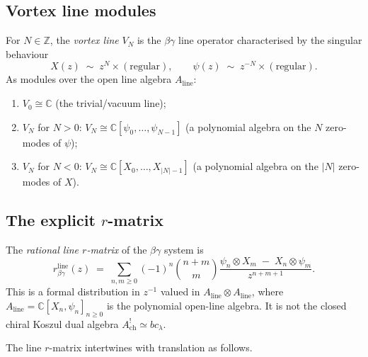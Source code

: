 \subsection{Vortex line modules}

\begin{definition}
\label{def:betagamma-vortex-lines}
For $N \in \mathbb{Z}$, the \emph{vortex line} $V_N$ is the
$\beta\gamma$ line operator characterised by the singular behaviour
\[
 X(z) \;\sim\; z^N \times (\text{regular}),
 \qquad
 \psi(z) \;\sim\; z^{-N} \times (\text{regular}).
\]
As modules over the open line algebra $A_{\mathrm{line}}$:
\begin{enumerate}
\item $V_0 \cong \mathbb{C}$ (the trivial/vacuum line);
\item $V_{N}$ for $N > 0$: $V_N \cong \mathbb{C}[\psi_0,\ldots,\psi_{N-1}]$
 (a polynomial algebra on the $N$ zero-modes of $\psi$);
\item $V_{N}$ for $N < 0$: $V_N \cong \mathbb{C}[X_0,\ldots,X_{|N|-1}]$
 (a polynomial algebra on the $|N|$ zero-modes of $X$).
\end{enumerate}
\end{definition}

\subsection{The explicit \texorpdfstring{$r$}{r}-matrix}

\begin{definition}
\label{def:betagamma-r-matrix}
The \emph{rational line $r$-matrix} of the $\beta\gamma$ system is
\begin{equation}\label{eq:betagamma-r-matrix}
 r^{\mathrm{line}}_{\beta\gamma}(z)
 \;=\;
 \sum_{n,m \ge 0}
 (-1)^n \binom{n+m}{m}
 \frac{\psi_n \otimes X_m \;-\; X_n \otimes \psi_m}{z^{n+m+1}}.
\end{equation}
This is a formal distribution in $z^{-1}$ valued in
$A_{\mathrm{line}}\otimes A_{\mathrm{line}}$, where
$A_{\mathrm{line}}=\mathbb{C}[X_n,\psi_n]_{n\ge0}$ is the polynomial
open-line algebra. It is not the closed chiral Koszul dual algebra
$A^!_{\mathrm{ch}}\simeq bc_\lambda$.
\end{definition}

The line $r$-matrix intertwines with translation as follows.

